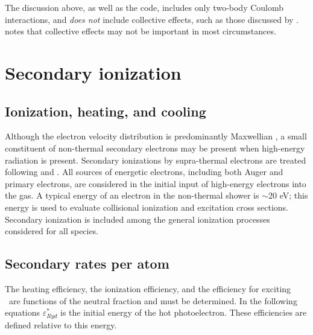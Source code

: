 The discussion above, as well as the code, includes only two-body Coulomb
interactions, and \emph{does not} include collective effects, such as those
discussed by \citet{Scott1980}.  \citet{Rephaeli1987} notes that collective
effects may not be important in most circumstances.

\section{Secondary ionization}

\subsection{Ionization, heating, and cooling}

Although the electron velocity distribution is predominantly Maxwellian
\citep{Bohm1947}, a small constituent of non-thermal secondary electrons
may be present when high-energy radiation is present.
Secondary ionizations
by supra-thermal electrons are treated following \citet{Xu1991} and
\citet{Dalgarno1999}.
All sources of energetic electrons, including both
Auger and primary electrons, are considered in the initial input of
high-energy electrons into the gas.
A typical energy of an electron in the non-thermal shower is
$\sim $20 eV; this energy is used to evaluate collisional ionization and excitation
cross sections.
Secondary ionization is included among the general
ionization processes considered for all species.

\subsection{Secondary rates per atom}

The heating efficiency, the ionization efficiency,
and the efficiency for exciting \la\ are functions of the neutral
fraction and must be determined.
In the following equations $\varepsilon _{Ryd}^*$
is the initial energy of the hot photoelectron.
These efficiencies are defined relative to this energy.

